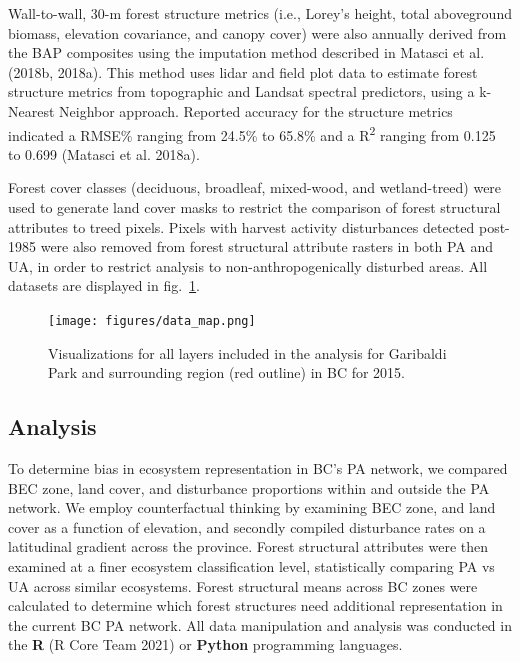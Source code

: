 \documentclass[10pt,oneside]{article}
\begin{document}
Wall-to-wall, 30-m forest structure metrics (i.e., Lorey's height, total
aboveground biomass, elevation covariance, and canopy cover) were also
annually derived from the BAP composites using the imputation method
described in Matasci et al. (2018b, 2018a). This method uses lidar and
field plot data to estimate forest structure metrics from topographic
and Landsat spectral predictors, using a k-Nearest Neighbor approach.
Reported accuracy for the structure metrics indicated a RMSE\% ranging
from 24.5\% to 65.8\% and a R\textsuperscript{2} ranging from 0.125 to
0.699 (Matasci et al. 2018a).

Forest cover classes (deciduous, broadleaf, mixed-wood, and
wetland-treed) were used to generate land cover masks to restrict the
comparison of forest structural attributes to treed pixels. Pixels with
harvest activity disturbances detected post-1985 were also removed from
forest structural attribute rasters in both PA and UA, in order to
restrict analysis to non-anthropogenically disturbed areas. All datasets
are displayed in fig.~\ref{fig:data-fig}.

\begin{figure}
\hypertarget{fig:data-fig}{%
\centering
\texttt{[image: figures/data\_map.png]}
\caption{Visualizations for all layers included in the analysis for
Garibaldi Park and surrounding region (red outline) in BC for
2015.}\label{fig:data-fig}
}
\end{figure}

\hypertarget{analysis}{%
\subsection{Analysis}\label{analysis}}

To determine bias in ecosystem representation in BC's PA network, we
compared BEC zone, land cover, and disturbance proportions within and
outside the PA network. We employ counterfactual thinking by examining
BEC zone, and land cover as a function of elevation, and secondly
compiled disturbance rates on a latitudinal gradient across the
province. Forest structural attributes were then examined at a finer
ecosystem classification level, statistically comparing PA vs UA across
similar ecosystems. Forest structural means across BC zones were
calculated to determine which forest structures need additional
representation in the current BC PA network. All data manipulation and
analysis was conducted in the \textbf{R} (R Core Team 2021) or
\textbf{Python} programming languages.
\end{document}
